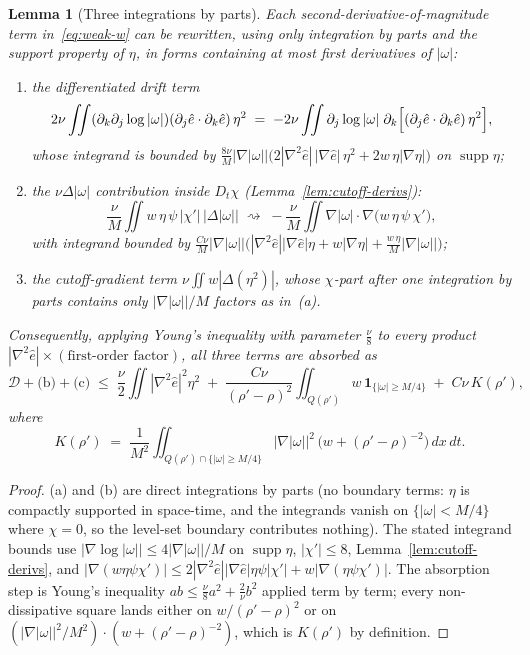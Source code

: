 \documentclass[11pt]{article}
\newtheorem{lemma}[theorem]{Lemma}
\theoremstyle{definition}
\theoremstyle{remark}
\begin{document}
\begin{lemma}[Three integrations by parts]\label{lem:three-ibp}
  Each second-derivative-of-magnitude term in~\eqref{eq:weak-w} can be
  rewritten, using only integration by parts and the support property of
  $\eta$, in forms containing at most first derivatives of $|\omega|$:
  \begin{enumerate}[label=(\alph*)]
    \item the differentiated drift term
    \[
      2\nu\iint (\partial_k\partial_j\log|\omega|)(\partial_j\hat{e}\cdot\partial_k\hat{e})\,\eta^2
      \;=\; -2\nu\iint \partial_j\log|\omega|\;
        \partial_k\Bigl[(\partial_j\hat{e}\cdot\partial_k\hat{e})\,\eta^2\Bigr],
    \]
    whose integrand is bounded by
    $\tfrac{8\nu}{M}|\nabla|\omega||\bigl(2|\nabla^2\hat{e}|\,|\nabla\hat{e}|\,\eta^2
    + 2 w\,\eta|\nabla\eta|\bigr)$ on $\operatorname{supp}\eta$;
    \item the $\nu\Delta|\omega|$ contribution inside $D_t\chi$
    (Lemma~\ref{lem:cutoff-derivs}):
    \[
      \frac{\nu}{M}\iint w\,\eta\,\psi\,|\chi'|\,\bigl|\Delta|\omega|\bigr|
      \;\rightsquigarrow\;
      -\frac{\nu}{M}\iint \nabla|\omega|\cdot\nabla\bigl(w\,\eta\,\psi\,\chi'\bigr),
    \]
    with integrand bounded by
    $\tfrac{C\nu}{M}|\nabla|\omega||\bigl(|\nabla^2\hat{e}||\nabla\hat{e}|\eta
    + w|\nabla\eta| + \tfrac{w\,\eta}{M}|\nabla|\omega||\bigr)$;
    \item the cutoff-gradient term $\nu\iint w|\Delta(\eta^2)|$, whose
    $\chi$-part after one integration by parts contains only
    $|\nabla|\omega||/M$ factors as in~(a).
  \end{enumerate}
  Consequently, applying Young's inequality with parameter
  $\tfrac{\nu}{8}$ to every product
  $|\nabla^2\hat{e}|\times(\text{first-order factor})$, all three terms are
  absorbed as
  \[
    \mathcal{D} + \text{(b)} + \text{(c)} \;\leq\;
    \frac{\nu}{2}\iint|\nabla^2\hat{e}|^2\eta^2
    \;+\; \frac{C\nu}{(\rho'-\rho)^2}\iint_{Q(\rho')} w\,\mathbf{1}_{\{|\omega|\geq M/4\}}
    \;+\; C\nu\,K(\rho'),
  \]
  where
  \begin{equation}\label{eq:K-def}
    K(\rho') \;=\; \frac{1}{M^2}\iint_{Q(\rho')\cap\{|\omega|\geq M/4\}}
      \bigl|\nabla|\omega|\bigr|^2\,\bigl(w + (\rho'-\rho)^{-2}\bigr)\,dx\,dt.
  \end{equation}
\end{lemma}
\begin{proof}
  (a) and (b) are direct integrations by parts (no boundary terms:
  $\eta$ is compactly supported in space-time, and the integrands vanish on
  $\{|\omega|<M/4\}$ where $\chi=0$, so the level-set boundary contributes
  nothing). The stated integrand bounds use
  $|\nabla\log|\omega||\leq 4|\nabla|\omega||/M$ on
  $\operatorname{supp}\eta$, $|\chi'|\leq 8$,
  Lemma~\ref{lem:cutoff-derivs}, and
  $|\nabla(w\eta\psi\chi')| \leq 2|\nabla^2\hat{e}||\nabla\hat{e}|\eta\psi|\chi'|
  + w|\nabla(\eta\psi\chi')|$. The absorption step is Young's inequality
  $ab\leq \tfrac{\nu}{8}a^2 + \tfrac{2}{\nu}b^2$ applied term by term;
  every non-dissipative square lands either on
  $w/(\rho'-\rho)^2$ or on $(|\nabla|\omega||^2/M^2)\cdot(w + (\rho'-\rho)^{-2})$,
  which is $K(\rho')$ by definition.
\end{proof}
\end{document}
